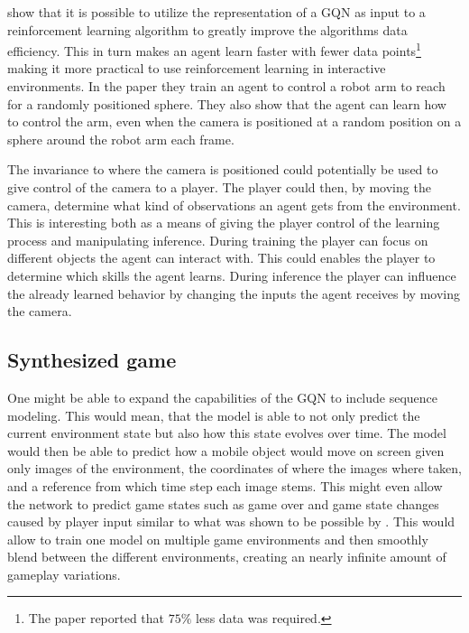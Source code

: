 \cite{gqn} show that it is possible to utilize the representation of a GQN as input to a reinforcement learning algorithm to greatly improve the algorithms data efficiency. This in turn makes an agent learn faster with fewer data points\footnote{The paper reported that $75\%$ less data was required.} making it more practical to use reinforcement learning in interactive environments. In the paper they train an agent to control a robot arm to reach for a randomly positioned sphere. They also show that the agent can learn how to control the arm, even when the camera is positioned at a random position on a sphere around the robot arm each frame.

The invariance to where the camera is positioned could potentially be used to give control of the camera to a player. The player could then, by moving the camera, determine what kind of observations an agent gets from the environment. This is interesting both as a means of giving the player control of the learning process and manipulating inference. During training the player can focus on different objects the agent can interact with. This could enables the player to determine which skills the agent learns. During inference the player can influence the already learned behavior by changing the inputs the agent receives by moving the camera.


%
%


\subsection{Synthesized game}
One might be able to expand the capabilities of the GQN to include sequence modeling. This would mean, that the model is able to not only predict the current environment state but also how this state evolves over time. The model would then be able to predict how a mobile object would move on screen given only images of the environment, the coordinates of where the images where taken, and a reference from which time step each image stems. This might even allow the network to predict game states such as game over and game state changes caused by player input similar to what was shown to be possible by \cite{Ha2018-dd}. This would allow to train one model on multiple game environments and then smoothly blend between the different environments, creating an nearly infinite amount of gameplay variations.
